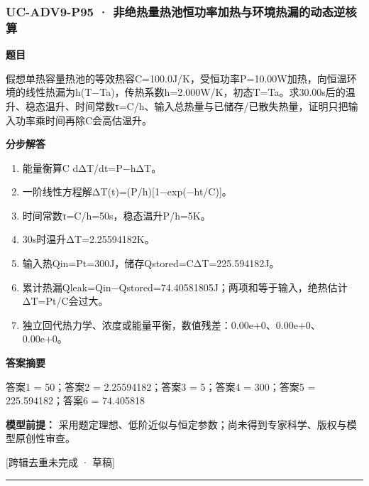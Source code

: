 \documentclass[UTF8,11pt,a4paper]{ctexart}
\begin{document}
\subsubsection*{UC-ADV9-P95 · 非绝热量热池恒功率加热与环境热漏的动态逆核算}
\noindent\textbf{题目}\par
假想单热容量热池的等效热容C=100.0J/K，受恒功率P=10.00W加热，向恒温环境的线性热漏为h(T−Ta)，传热系数h=2.000W/K，初态T=Ta。求30.00s后的温升、稳态温升、时间常数τ=C/h、输入总热量与已储存/已散失热量，证明只把输入功率乘时间再除C会高估温升。\par
\medskip\noindent\textbf{分步解答}
\begin{enumerate}
\item 能量衡算C dΔT/dt=P−hΔT。
\item 一阶线性方程解ΔT(t)=(P/h)[1−exp(−ht/C)]。
\item 时间常数τ=C/h=50s，稳态温升P/h=5K。
\item 30s时温升ΔT=2.25594182K。
\item 输入热Qin=Pt=300J，储存Qstored=CΔT=225.594182J。
\item 累计热漏Qleak=Qin−Qstored=74.40581805J；两项和等于输入，绝热估计ΔT=Pt/C会过大。
\item 独立回代热力学、浓度或能量平衡，数值残差：0.00e+0、0.00e+0、0.00e+0。
\end{enumerate}
\noindent\textbf{答案摘要}\par
答案1 = 50；答案2 = 2.25594182；答案3 = 5；答案4 = 300；答案5 = 225.594182；答案6 = 74.405818\par
\noindent\textbf{模型前提：}
采用题定理想、低阶近似与恒定参数；尚未得到专家科学、版权与模型原创性审查。\par
\noindent\textcolor{red!65!black}{[跨辑去重未完成 · 草稿]} \par
\medskip\hrule\medskip
{}
\end{document}
